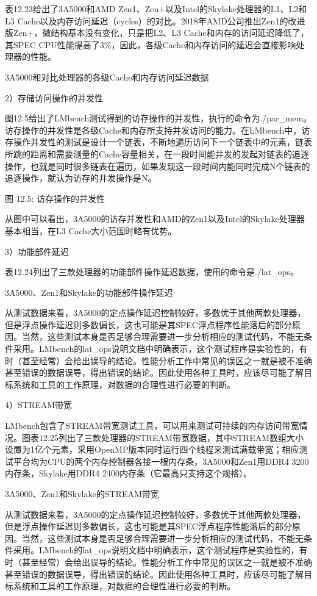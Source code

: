 \documentclass[]{ctexbook}
\begin{document}
表12.23给出了3A5000和AMD Zen1、Zen+以及Intel的Skylake处理器的L1、L2和L3 Cache以及内存访问延迟（cycles）的对比。2018年AMD公司推出Zen1的改进版Zen+，微结构基本没有变化，只是把L2、L3 Cache和内存的访问延迟降低了，其SPEC CPU性能提高了3\%，因此，各级Cache和内存访问的延迟会直接影响处理器的性能。

\label{tab:memory-latency}3A5000和对比处理器的各级Cache和内存访问延迟数据

2）存储访问操作的并发性

图12.5给出了LMbench测试得到的访存操作的并发性，执行的命令为./par\_mem。访存操作的并发性是各级Cache和内存所支持并发访问的能力。在LMbench中，访存操作并发性的测试是设计一个链表，不断地遍历访问下一个链表中的元素，链表所跳的距离和需要测量的Cache容量相关，在一段时间能并发的发起对链表的追逐操作，也就是同时很多链表在遍历，如果发现这一段时间内能同时完成N个链表的追逐操作，就认为访存的并发操作是N。

图 12.5: 访存操作的并发性

从图中可以看出，3A5000的访存并发性和AMD的Zen1以及Intel的Skylake处理器基本相当，在L3 Cache大小范围时略有优势。

3）功能部件延迟

表12.24列出了三款处理器的功能部件操作延迟数据，使用的命令是./lat\_ops。

\label{tab:alu-delay}3A5000、Zen1和Skylake的功能部件操作延迟

从测试数据来看，3A5000的定点操作延迟控制较好，多数优于其他两款处理器，但是浮点操作延迟则多数偏长，这也可能是其SPEC浮点程序性能落后的部分原因。当然，这些测试本身是否足够合理需要进一步分析相应的测试代码，不能无条件采用。LMbench的lat\_ops说明文档中明确表示，这个测试程序是实验性的，有时（甚至经常）会给出误导的结论。性能分析工作中常见的误区之一就是被不准确甚至错误的数据误导，得出错误的结论。因此使用各种工具时，应该尽可能了解目标系统和工具的工作原理，对数据的合理性进行必要的判断。

4）STREAM带宽

LMbench包含了STREAM带宽测试工具，可以用来测试可持续的内存访问带宽情况。图表12.25列出了三款处理器的STREAM带宽数据，其中STREAM数组大小设置为1亿个元素，采用OpenMP版本同时运行四个线程来测试满载带宽；相应测试平台均为CPU的两个内存控制器各接一根内存条，3A5000和Zen1用DDR4 3200内存条，Skylake用DDR4 2400内存条（它最高只支持这个规格）。

\label{tab:stream-bandwidth}3A5000、Zen1和Skylake的STREAM带宽

从测试数据来看，3A5000的定点操作延迟控制较好，多数优于其他两款处理器，但是浮点操作延迟则多数偏长，这也可能是其SPEC浮点程序性能落后的部分原因。当然，这些测试本身是否足够合理需要进一步分析相应的测试代码，不能无条件采用。LMbench的lat\_ops说明文档中明确表示，这个测试程序是实验性的，有时（甚至经常）会给出误导的结论。性能分析工作中常见的误区之一就是被不准确甚至错误的数据误导，得出错误的结论。因此使用各种工具时，应该尽可能了解目标系统和工具的工作原理，对数据的合理性进行必要的判断。
\end{document}
